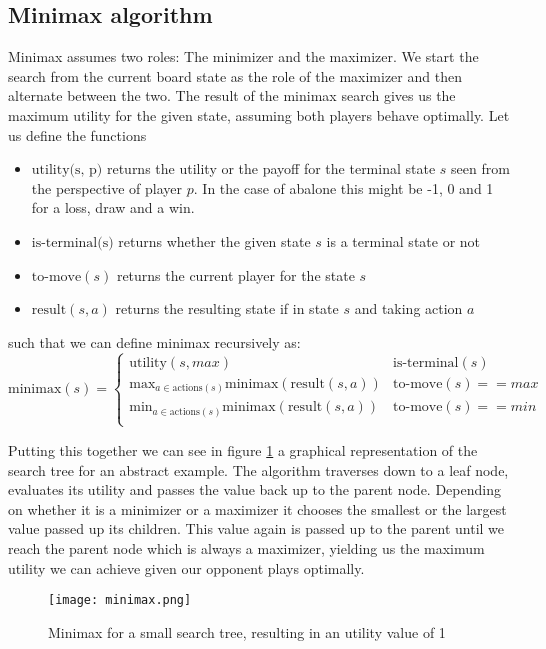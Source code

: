 \subsection{Minimax algorithm}
Minimax assumes two roles: The minimizer and the maximizer. We start the search from the current board state as the role of the maximizer and then alternate between the two. The result of the minimax search gives us the maximum utility for the given state, assuming both players behave optimally. Let us define the functions
\begin{itemize}
    \item $\text{utility(s, p)}$ returns the utility or the payoff for the terminal state $s$ seen from the perspective of player $p$. In the case of abalone this might be -1, 0 and 1 for a loss, draw and a win.
    \item $\text{is-terminal(s)}$ returns whether the given state $s$ is a terminal state or not
    \item $\text{to-move}(s)$ returns the current player for the state $s$
    \item $\text{result}(s, a)$ returns the resulting state if in state $s$ and taking action $a$
\end{itemize}
such that we can define minimax recursively as:
$$
    \text{minimax}(s) =
    \begin{cases}
        \text{utility}(s, max)                                                & \text{is-terminal}(s)    \\
        \text{max}_{a\in\text{actions}(s)}\text{minimax}(\text{result}(s, a)) & \text{to-move}(s) == max \\
        \text{min}_{a\in\text{actions}(s)}\text{minimax}(\text{result}(s, a)) & \text{to-move}(s) == min \\
    \end{cases}
$$

Putting this together we can see in figure \ref{minimax} a graphical representation of the search tree for an abstract example. The algorithm traverses down to a leaf node, evaluates its utility and passes the value back up to the parent node. Depending on whether it is a minimizer or a maximizer it chooses the smallest or the largest value passed up its children. This value again is passed up to the parent until we reach the parent node which is always a maximizer, yielding us the maximum utility we can achieve given our opponent plays optimally.

\begin{figure}
    \centering
    \texttt{[image: minimax.png]}
    \caption{Minimax for a small search tree, resulting in an utility value of 1}
    \label{minimax}
\end{figure}

